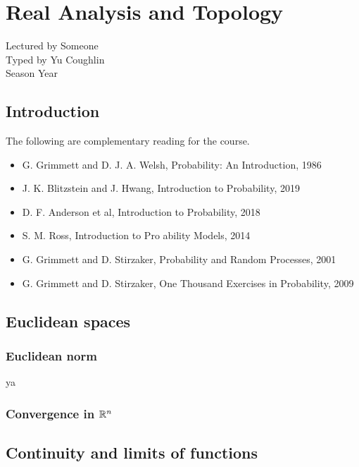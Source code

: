 \documentclass[../Year2.tex]{subfiles}
\begin{document}
\chapter{Real Analysis and Topology}
\renewcommand*\thesection{\arabic{section}}
Lectured by Someone \\ Typed by Yu Coughlin \\
Season Year

\section*{Introduction}

The following are complementary reading for the course.
\begin{itemize}
    \item G. Grimmett and D. J. A. Welsh, Probability: An Introduction, 1986
    \item J. K. Blitzstein and J. Hwang, Introduction to Probability, 2019
    \item D. F. Anderson et al, Introduction to Probability, 2018
    \item S. M. Ross, Introduction to Pro ability Models, 2014
    \item G. Grimmett and D. Stirzaker, Probability and Random Processes, 2001
    \item G. Grimmett and D. Stirzaker, One Thousand Exercises in Probability, 2009
\end{itemize}

\tableofcontents\pagebreak


\section{Euclidean spaces}

\subsection{Euclidean norm}

ya

\subsection{Convergence in $\mathbb{R}^n$}

\section{Continuity and limits of functions}
\end{document}
